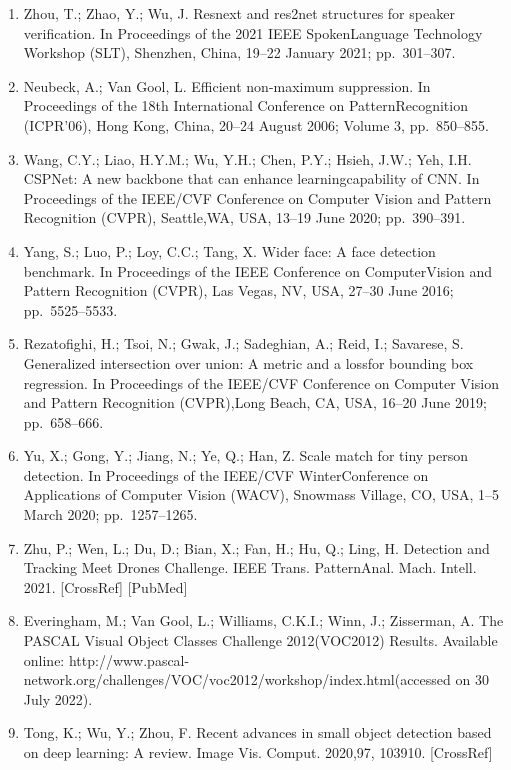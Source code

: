 \documentclass[
  10
]{article}
\begin{document}
\begin{enumerate}
  Honolulu, HI, USA, 21--26 July 2017;pp.~1492--1500.
\item
  Zhou, T.; Zhao, Y.; Wu, J. Resnext and res2net structures for speaker
  verification. In Proceedings of the 2021 IEEE SpokenLanguage
  Technology Workshop (SLT), Shenzhen, China, 19--22 January 2021;
  pp.~301--307.
\item
  Neubeck, A.; Van Gool, L. Efficient non-maximum suppression. In
  Proceedings of the 18th International Conference on PatternRecognition
  (ICPR'06), Hong Kong, China, 20--24 August 2006; Volume 3,
  pp.~850--855.
\item
  Wang, C.Y.; Liao, H.Y.M.; Wu, Y.H.; Chen, P.Y.; Hsieh, J.W.; Yeh, I.H.
  CSPNet: A new backbone that can enhance learningcapability of CNN. In
  Proceedings of the IEEE/CVF Conference on Computer Vision and Pattern
  Recognition (CVPR), Seattle,WA, USA, 13--19 June 2020; pp.~390--391.
\item
  Yang, S.; Luo, P.; Loy, C.C.; Tang, X. Wider face: A face detection
  benchmark. In Proceedings of the IEEE Conference on ComputerVision and
  Pattern Recognition (CVPR), Las Vegas, NV, USA, 27--30 June 2016;
  pp.~5525--5533.
\item
  Rezatofighi, H.; Tsoi, N.; Gwak, J.; Sadeghian, A.; Reid, I.;
  Savarese, S. Generalized intersection over union: A metric and a
  lossfor bounding box regression. In Proceedings of the IEEE/CVF
  Conference on Computer Vision and Pattern Recognition (CVPR),Long
  Beach, CA, USA, 16--20 June 2019; pp.~658--666.
\item
  Yu, X.; Gong, Y.; Jiang, N.; Ye, Q.; Han, Z. Scale match for tiny
  person detection. In Proceedings of the IEEE/CVF WinterConference on
  Applications of Computer Vision (WACV), Snowmass Village, CO, USA,
  1--5 March 2020; pp.~1257--1265.
\item
  Zhu, P.; Wen, L.; Du, D.; Bian, X.; Fan, H.; Hu, Q.; Ling, H.
  Detection and Tracking Meet Drones Challenge. IEEE Trans. PatternAnal.
  Mach. Intell. 2021. {[}CrossRef{]} {[}PubMed{]}
\item
  Everingham, M.; Van Gool, L.; Williams, C.K.I.; Winn, J.; Zisserman,
  A. The PASCAL Visual Object Classes Challenge 2012(VOC2012) Results.
  Available online:
  http://www.pascal-network.org/challenges/VOC/voc2012/workshop/index.html(accessed
  on 30 July 2022).
\item
  Tong, K.; Wu, Y.; Zhou, F. Recent advances in small object detection
  based on deep learning: A review. Image Vis. Comput. 2020,97, 103910.
  {[}CrossRef{]}
\end{enumerate}
\end{document}
